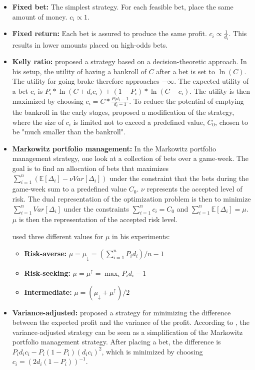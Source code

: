 \begin{itemize}
    \item \textbf{Fixed bet:} The simplest strategy. For each feasible bet, place the same amount of money. $c_{i} \propto 1$.
    
    \item \textbf{Fixed return:} Each bet is assured to produce the same profit. $c_{i} \propto \frac{1}{d_{i}}$. This results in lower amounts placed on high-odds bets.
    
    \item \textbf{Kelly ratio:} \citet{bib:kelly-1956} proposed a strategy based on a decision-theoretic approach. In his setup, the utility of having a bankroll of $C$ after a bet is set to $\ln(C)$. The utility for going broke therefore approaches $- \infty$. The expected utility of a bet $c_{i}$ is $P_{i} * \ln(C + d_{i} c_{i}) + (1 - P_{i}) * \ln(C - c_{i})$. The utility is then maximized by choosing $c_{i} = C * \frac{P_{i} d_{i} - 1}{d_{i} - 1}$. To reduce the potential of emptying the bankroll in the early stages, \citet{bib:langseth-2013} proposed a modification of the strategy, where the size of $c_{i}$ is limited not to exceed a predefined value, $C_{0}$, chosen to be "much smaller than the bankroll".
    
    \item \textbf{Markowitz portfolio management:} In the Markowitz portfolio management strategy, one look at a collection of bets over a game-week. The goal is to find an allocation of bets that maximizes $\sum_{i=1}^{n} (\mathbb{E}[\Delta_{i}] - \nu Var[\Delta_{i}])$ under the constraint that the bets during the game-week sum to a predefined value $C_{0}$. $\nu$ represents the accepted level of risk. The dual representation of the optimization problem is then to minimize $\sum_{i=1}^{n} Var[\Delta_{i}]$ under the constraints $\sum_{i=1}^{n} c_{i} = C_{0}$ and $\sum_{i=1}^{n} \mathbb{E}[\Delta_{i}] = \mu$. $\mu$ is then the representation of the accepted risk level.
    
    \citet{bib:langseth-2013} used three different values for $\mu$ in his experiments:
    \begin{itemize}
        \item \textbf{Risk-averse:} $\mu = \mu_{\downarrow} = (\sum_{i=1}^{n} P_{i} d_{i}) / n - 1$
        \item \textbf{Risk-seeking:} $\mu = \mu^{\uparrow} = \max_{i} P_{i} d_{i} - 1$
        \item \textbf{Intermediate:} $\mu = (\mu_{\downarrow} + \mu^{\uparrow}) / 2$
    \end{itemize}
    
    \item \textbf{Variance-adjusted:} \citet{bib:rue-salvesen-2000} proposed a strategy for minimizing the difference between the expected profit and the variance of the profit. According to \citet{bib:langseth-2013}, the variance-adjusted strategy can be seen as a simplification of the Markowitz portfolio management strategy. After placing a bet, the difference is $P_{i} d_{i} c_{i} - P_{i}(1 - P_{i})(d_{i} c_{i})^{2}$, which is minimized by choosing $c_{i} = (2 d_{i} (1 - P_{i}))^{-1}$.
\end{itemize}
